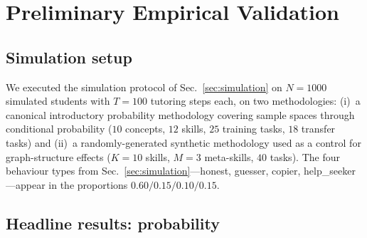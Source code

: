 \section{Preliminary Empirical Validation}\label{sec:empirical}

\subsection{Simulation setup}

We executed the simulation protocol of Sec.~\ref{sec:simulation} on $N=1000$ simulated students with $T=100$ tutoring steps each, on two methodologies: (i)~a canonical introductory probability methodology covering sample spaces through conditional probability ($10$ concepts, $12$ skills, $25$ training tasks, $18$ transfer tasks) and (ii)~a randomly-generated synthetic methodology used as a control for graph-structure effects ($K=10$ skills, $M=3$ meta-skills, $40$ tasks). The four behaviour types from Sec.~\ref{sec:simulation}—honest, guesser, copier, help\_seeker—appear in the proportions $0.60/0.15/0.10/0.15$.

\subsection{Headline results: probability}

